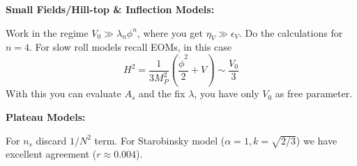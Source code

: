 \begin{mycolorbox}
    \textbf{Small Fields/Hill-top \& Inflection Models:}

    Work in the regime $V_0 \gg \lambda_n \phi^n$, where you get $\eta_V \gg \epsilon_V$. Do the calculations for $n=4$.
    For slow roll models recall EOMs, in this case 
    \begin{equation}
        H^2 = \frac{1}{3M^2_P} \left(\frac{\dot{\phi}^2}{2} + V\right)  \sim \frac{V_0}{3}
    \end{equation}
    With this you can evaluate $A_s$ and the fix $\lambda$, you have only $V_0$ as free parameter.

\end{mycolorbox}

\begin{mycolorbox}
    \textbf{Plateau Models:}

   For $n_s$ discard $1/N^2$ term. For Starobinsky model ($\alpha=1, k=\sqrt{2/3}$) we have excellent agreement ($r \approx 0.004$).
\end{mycolorbox}